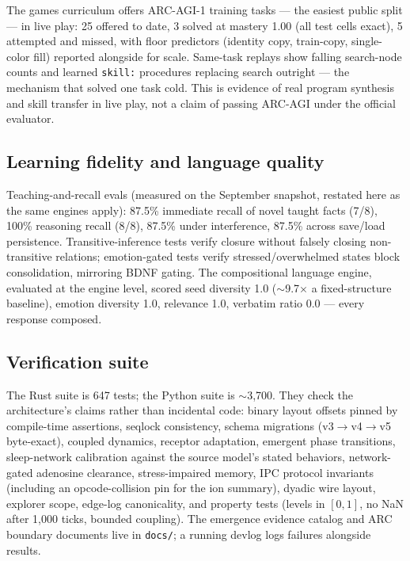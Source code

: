 \documentclass[11pt]{article}
\newcommand{\code}[1]{\texttt{\small #1}}
\begin{document}
The games curriculum offers ARC-AGI-1 training tasks --- the easiest
public split --- in live play: 25 offered to date, 3 solved at mastery
1.00 (all test cells exact), 5 attempted and missed, with floor
predictors (identity copy, train-copy, single-color fill) reported
alongside for scale. Same-task replays show falling search-node counts
and learned \code{skill:} procedures replacing search outright --- the
mechanism that solved one task cold. This is evidence of real program
synthesis and skill transfer in live play, not a claim of passing
ARC-AGI under the official evaluator.

\subsection{Learning fidelity and language quality}

Teaching-and-recall evals (measured on the September snapshot, restated
here as the same engines apply): 87.5\% immediate recall of novel
taught facts (7/8), 100\% reasoning recall (8/8), 87.5\% under
interference, 87.5\% across save/load persistence. Transitive-inference
tests verify closure without falsely closing non-transitive relations;
emotion-gated tests verify stressed/overwhelmed states block
consolidation, mirroring BDNF gating. The compositional language
engine, evaluated at the engine level, scored seed diversity 1.0
($\sim$9.7$\times$ a fixed-structure baseline), emotion diversity 1.0,
relevance 1.0, verbatim ratio 0.0 --- every response composed.

\subsection{Verification suite}

The Rust suite is 647 tests; the Python suite is $\sim$3{,}700. They
check the architecture's claims rather than incidental code: binary
layout offsets pinned by compile-time assertions, seqlock consistency,
schema migrations (v3$\to$v4$\to$v5 byte-exact), coupled dynamics,
receptor adaptation, emergent phase transitions, sleep-network
calibration against the source model's stated behaviors, network-gated
adenosine clearance, stress-impaired memory, IPC protocol invariants
(including an opcode-collision pin for the ion summary), dyadic wire
layout, explorer scope, edge-log canonicality, and property tests
(levels in $[0,1]$, no NaN after 1{,}000 ticks, bounded coupling). The
emergence evidence catalog and ARC boundary documents live in
\code{docs/}; a running devlog logs failures alongside results.
\end{document}
